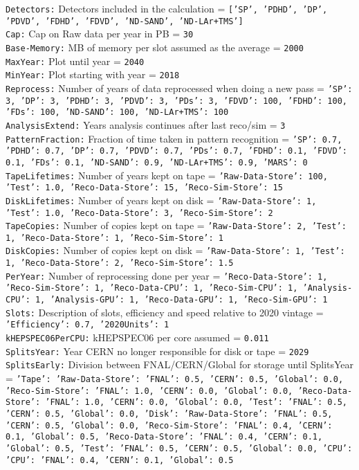 {\tt Detectors:} Detectors included in the calculation = {\tt ['SP', 'PDHD', 'DP', 'PDVD', 'FDHD', 'FDVD', 'ND-SAND', 'ND-LAr+TMS']} \\
{\tt Cap:} Cap on Raw data per year in PB = {\tt 30} \\
{\tt Base-Memory:} MB of memory per slot assumed as the average = {\tt 2000} \\
{\tt MaxYear:} Plot until year = {\tt 2040} \\
{\tt MinYear:} Plot starting with year = {\tt 2018} \\
{\tt Reprocess:} Number of years of data reprocessed when doing a new pass = {\tt {'SP': 3, 'DP': 3, 'PDHD': 3, 'PDVD': 3, 'PDs': 3, 'FDVD': 100, 'FDHD': 100, 'FDs': 100, 'ND-SAND': 100, 'ND-LAr+TMS': 100}} \\
{\tt AnalysisExtend:} Years analysis continues after last reco/sim = {\tt 3} \\
{\tt PatternFraction:} Fraction of time taken in pattern recognition = {\tt {'SP': 0.7, 'PDHD': 0.7, 'DP': 0.7, 'PDVD': 0.7, 'PDs': 0.7, 'FDHD': 0.1, 'FDVD': 0.1, 'FDs': 0.1, 'ND-SAND': 0.9, 'ND-LAr+TMS': 0.9, 'MARS': 0}} \\
{\tt TapeLifetimes:} Number of years kept on tape = {\tt {'Raw-Data-Store': 100, 'Test': 1.0, 'Reco-Data-Store': 15, 'Reco-Sim-Store': 15}} \\
{\tt DiskLifetimes:} Number of years kept on disk = {\tt {'Raw-Data-Store': 1, 'Test': 1.0, 'Reco-Data-Store': 3, 'Reco-Sim-Store': 2}} \\
{\tt TapeCopies:} Number of copies kept on tape = {\tt {'Raw-Data-Store': 2, 'Test': 1, 'Reco-Data-Store': 1, 'Reco-Sim-Store': 1}} \\
{\tt DiskCopies:} Number of copies kept on disk = {\tt {'Raw-Data-Store': 1, 'Test': 1, 'Reco-Data-Store': 2, 'Reco-Sim-Store': 1.5}} \\
{\tt PerYear:} Number of reprocessing done per year = {\tt {'Reco-Data-Store': 1, 'Reco-Sim-Store': 1, 'Reco-Data-CPU': 1, 'Reco-Sim-CPU': 1, 'Analysis-CPU': 1, 'Analysis-GPU': 1, 'Reco-Data-GPU': 1, 'Reco-Sim-GPU': 1}} \\
{\tt Slots:} Description of slots, efficiency and speed relative to 2020 vintage = {\tt {'Efficiency': 0.7, '2020Units': 1}} \\
{\tt kHEPSPEC06PerCPU:} kHEPSPEC06 per core assumed = {\tt 0.011} \\
{\tt SplitsYear:} Year CERN no longer responsible for disk or tape = {\tt 2029} \\
{\tt SplitsEarly:} Division between FNAL/CERN/Global for storage until SplitsYear = {\tt {'Tape': {'Raw-Data-Store': {'FNAL': 0.5, 'CERN': 0.5, 'Global': 0.0}, 'Reco-Sim-Store': {'FNAL': 1.0, 'CERN': 0.0, 'Global': 0.0}, 'Reco-Data-Store': {'FNAL': 1.0, 'CERN': 0.0, 'Global': 0.0}, 'Test': {'FNAL': 0.5, 'CERN': 0.5, 'Global': 0.0}}, 'Disk': {'Raw-Data-Store': {'FNAL': 0.5, 'CERN': 0.5, 'Global': 0.0}, 'Reco-Sim-Store': {'FNAL': 0.4, 'CERN': 0.1, 'Global': 0.5}, 'Reco-Data-Store': {'FNAL': 0.4, 'CERN': 0.1, 'Global': 0.5}, 'Test': {'FNAL': 0.5, 'CERN': 0.5, 'Global': 0.0}}, 'CPU': {'CPU': {'FNAL': 0.4, 'CERN': 0.1, 'Global': 0.5}}}} \\
